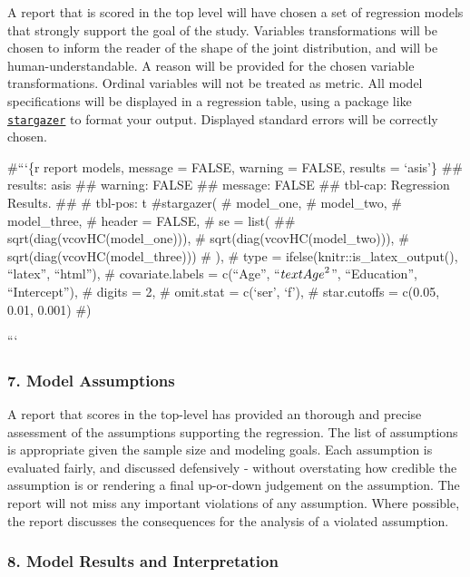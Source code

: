 \documentclass[
  letterpaper,
  DIV=11,
  numbers=noendperiod]{scrartcl}
\begin{document}
A report that is scored in the top level will have chosen a set of
regression models that strongly support the goal of the study. Variables
transformations will be chosen to inform the reader of the shape of the
joint distribution, and will be human-understandable. A reason will be
provided for the chosen variable transformations. Ordinal variables will
not be treated as metric. All model specifications will be displayed in
a regression table, using a package like
\href{https://cran.r-project.org/web/packages/stargazer/vignettes/stargazer.pdf}{\texttt{stargazer}}
to format your output. Displayed standard errors will be correctly
chosen.

\#```\{r report models, message = FALSE, warning = FALSE, results =
`asis'\} \#\#\textbar{} results: asis \#\#\textbar{} warning: FALSE
\#\#\textbar{} message: FALSE \#\#\textbar{} tbl-cap: Regression
Results. \#\#\textbar{} \#\textbar{} tbl-pos: t \#stargazer( \#
model\_one, \# model\_two, \# model\_three, \# header = FALSE, \# se =
list( \#\# sqrt(diag(vcovHC(model\_one))), \#
sqrt(diag(vcovHC(model\_two))), \# sqrt(diag(vcovHC(model\_three))) \#
), \# type = ifelse(knitr::is\_latex\_output(), ``latex'', ``html''), \#
covariate.labels = c(``Age'', ``\(\\text{Age}^2\)'', ``Education'',
``Intercept''), \# digits = 2, \# omit.stat = c(`ser', `f'), \#
star.cutoffs = c(0.05, 0.01, 0.001) \#)

```

\subsubsection{7. Model Assumptions}\label{model-assumptions}

A report that scores in the top-level has provided an thorough and
precise assessment of the assumptions supporting the regression. The
list of assumptions is appropriate given the sample size and modeling
goals. Each assumption is evaluated fairly, and discussed defensively -
without overstating how credible the assumption is or rendering a final
up-or-down judgement on the assumption. The report will not miss any
important violations of any assumption. Where possible, the report
discusses the consequences for the analysis of a violated assumption.

\subsubsection{8. Model Results and
Interpretation}\label{model-results-and-interpretation}
\end{document}
